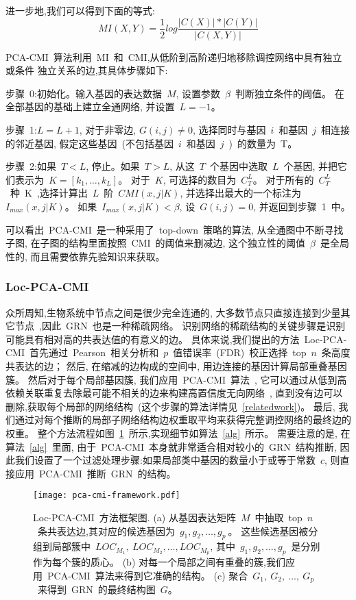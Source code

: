 进一步地,我们可以得到下面的等式:
\begin{equation}
    MI(X,Y)=\frac{1}{2}log\frac{|C(X)|*|C(Y)|}{|C(X,Y)|}
\end{equation}

PCA-CMI~算法利用~MI~和~CMI,从低阶到高阶递归地移除调控网络中具有独立或条件
独立关系的边,其具体步骤如下:

步骤~0:初始化。输入基因的表达数据~$M$, 设置参数~$\beta$~判断独立条件的阈值。
在全部基因的基础上建立全通网络, 并设置~$L=-1$。

步骤~1:$L=L+1$, 对于非零边, $G(i,j) \neq 0$, 选择同时与基因~$i$~和基因~$j$~相连接的邻近基因, 
假定这些基因~(不包括基因~$i$~和基因~$j$~)~的数量为~T。

步骤~2:如果~$T<L$, 停止。如果~$T>L$, 从这~$T$~个基因中选取~$L$~个基因, 
并把它们表示为~$K=[k_1,\ldots,k_L]$。
对于~$K$, 可选择的数目为~$C_T^L$。
对于所有的~$C_T^L$~种~K~,选择计算出~$L$~阶~$CMI(x,j|K)$,
并选择出最大的一个标注为~$I_{max}(x,j|K)$。
如果~$I_{max}(x,j|K) < \beta$, 设~$G(i,j)=0$, 并返回到步骤~1~中。

可以看出~PCA-CMI~是一种采用了~top-down~策略的算法, 
从全通图中不断寻找子图, 在子图的结构里面按照~CMI~的阈值来删减边, 这个独立性的阈值~$\beta$~是全局性的, 
而且需要依靠先验知识来获取。


\subsubsection{Loc-PCA-CMI}

众所周知,生物系统中节点之间是很少完全连通的,
大多数节点只直接连接到少量其它节点~\cite{jeong2000large},因此~GRN~也是一种稀疏网络。
识别网络的稀疏结构的关键步骤是识别可能具有相对高的共表达值的有意义的边。
具体来说,我们提出的方法~Loc-PCA-CMI~首先通过~Pearson~相关分析和~$p$~值错误率~(FDR)~校正选择~top~$n$~条高度共表达的边；
然后, 在缩减的边构成的空间中, 用边连接的基因计算局部重叠基因簇。
然后对于每个局部基因簇, 我们应用~PCA-CMI~算法~\cite{zhang2011inferring},
它可以通过从低到高依赖关联重复去除最可能不相关的边来构建高置信度无向网络~\cite{spirtes2000causation},
直到没有边可以删除,获取每个局部的网络结构~(这个步骤的算法详情见~\ref{relatedwork})。
最后, 我们通过对每个推断的局部子网络结构边权重取平均来获得完整调控网络的最终边的权重。
整个方法流程如图~\ref{pca-cmi-fr}~所示,实现细节如算法~\ref{alg}~所示。
需要注意的是,
在算法~\ref{alg}~里面,
由于~PCA-CMI~本身就非常适合相对较小的~GRN~结构推断,
因此我们设置了一个过滤处理步骤:如果局部类中基因的数量小于或等于常数~$c$,
则直接应用~PCA-CMI~推断~GRN~的结构。
\begin{figure}[!htbp]
    \centering
    \texttt{[image: pca-cmi-framework.pdf]}
    \caption{Loc-PCA-CMI~方法框架图.
    (a) 从基因表达矩阵~$M$~中抽取~top~$n$~条共表达边,其对应的候选基因为~$g_1,g_2,\ldots,g_{p}~$。
    这些候选基因被分组到局部簇中~$LOC_{M_1},~LOC_{M_2},\ldots,LOC_{M_{p}}$,
    其中~$g_1,g_2,\ldots,g_{p}$~是分别作为每个簇的质心。
    (b) 对每一个局部之间有重叠的簇,我们应用~PCA-CMI~算法来得到它准确的结构。
    (c) 聚合~$G_1,~G_2,~\ldots,~G_p$~来得到~GRN~的最终结构图~$G$。
    }
    \label{pca-cmi-fr}
\end{figure}



